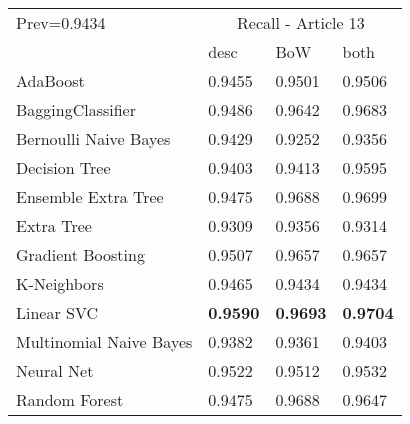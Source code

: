 \begin{tabular}{|l|l|l|l| }
\hline
Prev=0.9434 &  \multicolumn{3}{c|}{Recall - Article 13} \\
\cline{2-4} & desc & BoW & both \\ \hline
AdaBoost                & 0.9455 & 0.9501 & 0.9506\\
BaggingClassifier       & 0.9486 & 0.9642 & 0.9683\\
Bernoulli Naive Bayes   & 0.9429 & 0.9252 & 0.9356\\
Decision Tree           & 0.9403 & 0.9413 & 0.9595\\
Ensemble Extra Tree     & 0.9475 & 0.9688 & 0.9699\\
Extra Tree              & 0.9309 & 0.9356 & 0.9314\\
Gradient Boosting       & 0.9507 & 0.9657 & 0.9657\\
K-Neighbors             & 0.9465 & 0.9434 & 0.9434\\
Linear SVC              & {\bf 0.9590} & {\bf 0.9693} & {\bf 0.9704}\\
Multinomial Naive Bayes & 0.9382 & 0.9361 & 0.9403\\
Neural Net              & 0.9522 & 0.9512 & 0.9532\\
Random Forest           & 0.9475 & 0.9688 & 0.9647\\
\hline
\end{tabular}